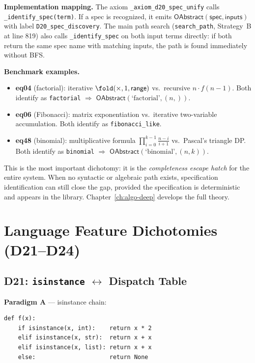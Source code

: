 \textbf{Implementation mapping.}
The axiom \texttt{\_axiom\_d20\_spec\_unify} calls
\texttt{\_identify\_spec(term)}.  If a spec is recognized, it emits
$\mathsf{OAbstract}(\mathsf{spec}, \mathsf{inputs})$ with label
\texttt{D20\_spec\_discovery}.  The main path search
(\texttt{search\_path}, Strategy~B at line 819) also calls
\texttt{\_identify\_spec} on both input terms directly: if both
return the same spec name with matching inputs, the path is found
immediately without BFS.

\textbf{Benchmark examples.}
\begin{itemize}
  \item \textbf{eq04} (factorial): iterative $\fold(\times, 1,
    \mathsf{range})$ vs.\ recursive $n \cdot f(n{-}1)$.
    Both identify as \texttt{factorial} $\Rightarrow$
    $\mathsf{OAbstract}(\text{`factorial'}, (n,))$.
  \item \textbf{eq06} (Fibonacci): matrix exponentiation vs.\
    iterative two-variable accumulation.
    Both identify as \texttt{fibonacci\_like}.
  \item \textbf{eq48} (binomial): multiplicative formula
    $\prod_{i=0}^{k-1} \frac{n-i}{i+1}$ vs.\ Pascal's triangle DP.
    Both identify as \texttt{binomial} $\Rightarrow$
    $\mathsf{OAbstract}(\text{`binomial'}, (n, k))$.
\end{itemize}

This is the most important dichotomy: it is the \emph{completeness
escape hatch} for the entire system.  When no syntactic or algebraic
path exists, specification identification can still close the gap,
provided the specification is deterministic and appears in the
library.  Chapter~\ref{ch:algo-deep} develops the full theory.


\chapter{Language Feature Dichotomies (D21--D24)}
\label{ch:lf-dichotomies}

\section{D21: \texttt{isinstance} $\leftrightarrow$ Dispatch Table}

\textbf{Paradigm A} --- isinstance chain:
\begin{lstlisting}
def f(x):
    if isinstance(x, int):    return x * 2
    elif isinstance(x, str):  return x + x
    elif isinstance(x, list): return x + x
    else:                     return None
\end{lstlisting}

